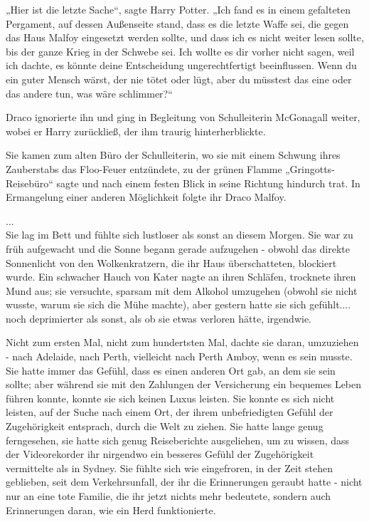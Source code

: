 {„Hier ist die letzte Sache“, sagte Harry Potter. „Ich fand es in einem gefalteten Pergament, auf dessen Außenseite stand, dass es die letzte Waffe sei, die gegen das Haus Malfoy eingesetzt werden sollte, und dass ich es nicht weiter lesen sollte, bis der ganze Krieg in der Schwebe sei. Ich wollte es dir vorher nicht sagen, weil ich dachte, es könnte deine Entscheidung ungerechtfertigt beeinflussen. Wenn du ein guter Mensch wärst, der nie tötet oder lügt, aber du müsstest das eine oder das andere tun, was wäre schlimmer?“

Draco ignorierte ihn und ging in Begleitung von Schulleiterin McGonagall weiter, wobei er Harry zurückließ, der ihm traurig hinterherblickte.

Sie kamen zum alten Büro der Schulleiterin, wo sie mit einem Schwung ihres Zauberstabs das Floo-Feuer entzündete, zu der grünen Flamme „Gringotts-Reisebüro“ sagte und nach einem festen Blick in seine Richtung hindurch trat. In Ermangelung einer anderen Möglichkeit folgte ihr Draco Malfoy.

...\\ Sie lag im Bett und fühlte sich lustloser als sonst an diesem Morgen. Sie war zu früh aufgewacht und die Sonne begann gerade aufzugehen - obwohl das direkte Sonnenlicht von den Wolkenkratzern, die ihr Haus überschatteten, blockiert wurde. Ein schwacher Hauch von Kater nagte an ihren Schläfen, trocknete ihren Mund aus; sie versuchte, sparsam mit dem Alkohol umzugehen (obwohl sie nicht wusste, warum sie sich die Mühe machte), aber gestern hatte sie sich gefühlt.... noch deprimierter als sonst, als ob sie etwas verloren hätte, irgendwie.

Nicht zum ersten Mal, nicht zum hundertsten Mal, dachte sie daran, umzuziehen - nach Adelaide, nach Perth, vielleicht nach Perth Amboy, wenn es sein musste. Sie hatte immer das Gefühl, dass es einen anderen Ort gab, an dem sie sein sollte; aber während sie mit den Zahlungen der Versicherung ein bequemes Leben führen konnte, konnte sie sich keinen Luxus leisten. Sie konnte es sich nicht leisten, auf der Suche nach einem Ort, der ihrem unbefriedigten Gefühl der Zugehörigkeit entsprach, durch die Welt zu ziehen. Sie hatte lange genug ferngesehen, sie hatte sich genug Reiseberichte ausgeliehen, um zu wissen, dass der Videorekorder ihr nirgendwo ein besseres Gefühl der Zugehörigkeit vermittelte als in Sydney. Sie fühlte sich wie eingefroren, in der Zeit stehen geblieben, seit dem Verkehrsunfall, der ihr die Erinnerungen geraubt hatte - nicht nur an eine tote Familie, die ihr jetzt nichts mehr bedeutete, sondern auch Erinnerungen daran, wie ein Herd funktionierte.

}
